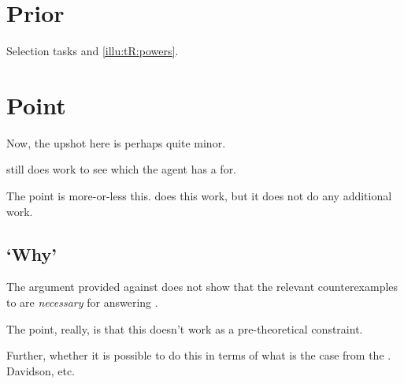 \section{Prior }
\label{sec:cscen1}

\begin{note}
  Selection tasks and \autoref{illu:tR:powers}.
\end{note}

\section{Point}
\label{sec:point}

\begin{note}
  Now, the upshot here is perhaps quite minor.

  \issueInclusion{} still does work to see which \ros{} the agent has a \wit{} for.

  The point is more-or-less this.
  \issueInclusion{} does this work, but it does not do any additional work.
\end{note}


\subsection{`Why'}
\label{sec:why}


\begin{note}
  The argument provided against \issueInclusion{} does not show that the relevant counterexamples to \issueInclusion{} are \emph{necessary} for answering \qWhy{}.

  The point, really, is that this doesn't work as a pre-theoretical constraint.


  Further, whether it is possible to do this in terms of what is the case from the \agpe{}.
  Davidson, etc.
\end{note}

